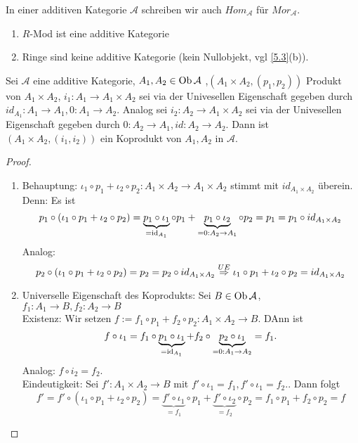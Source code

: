 \begin{anm}
	In einer additiven Kategorie $\mathcal{A} $ schreiben wir auch $Hom_{\mathcal{A}}$ für $Mor_{\mathcal{A}}. $
\end{anm}
\begin{bsp}
	\begin{enumerate} [label=\alph*)]
		\item $R$-Mod ist eine additive Kategorie
		\item Ringe sind keine additive Kategorie (kein Nullobjekt, vgl \ref{5.3}(b)).
	\end{enumerate}
\end{bsp}
\begin{sa}\label{5.11}
	Sei $\mathcal{A} $ eine additive Kategorie, $ A_1,A_2 \in \text{Ob}\,\mathcal{A}$ ,$(A_1 \times A_2, (p_1,p_2)) $ Produkt von $ A_1 \times A_2 $, $ i_1: A_1 \to A_1 \times A_2 $ sei via der Univesellen Eigenschaft gegeben durch $id_{A_1}: A_1 \to A_1 , 0: A_1 \to A_2$. Analog sei $ i_2: A_2 \to A_1 \times A_2 $ sei via der Univesellen Eigenschaft gegeben durch $ 0: A_2 \to A_1, id: A_2 \to A_2$. Dann ist $(A_1 \times A_2, (i_1,i_2)) $ ein Koprodukt von $A_1,A_2$ in $\mathcal{A}$.
\end{sa}
\begin{proof}
	\begin{enumerate}
		\item Behauptung: $\iota_1 \circ p_1 + \iota_2 \circ p_2: A_1 \times A_2 \to A_1 \times A_2 $ stimmt mit $id_{A_1 \times A_2} $ überein. Denn: Es ist
		$$p_1 \circ (\iota_1 \circ p_1 + \iota_2 \circ p_2) = \underbrace{p_1 \circ \iota_1}_{=\operatorname{id}_{A_1}} \circ p_1+ \underbrace{p_1 \circ \iota_2}_{=0:A_2\to A_1} \circ p_2 = p_1 = p_1 \circ id_{A_1 \times A_2}$$ 
		Analog: $$p_2 \circ (\iota_1 \circ p_1 + \iota_2 \circ p_2) = p_2 = p_2 \circ id_{A_1 \times A_2} \overset{UE}{\Rightarrow} \iota_1 \circ p_1 + \iota_2 \circ p_2 = id_{A_1 \times A_2}$$
		\item Universelle Eigenschaft des Koprodukts:
		 Sei $ B \in \text{Ob}\,\mathcal{A} $, $ f_1: A_1 \to B, f_2: A_2 \to B $\\
		 Existenz: Wir setzen $f:= f_1 \circ p_1 + f_2 \circ p_2: A_1 \times A_2 \to B$. DAnn ist 
		 $$f \circ \iota_1 = f_1 \circ \underbrace{p_1 \circ \iota_1}_{=\operatorname{id}_{A_1}} + f_2 \circ \underbrace{p_2 \circ \iota_1}_{=0:A_1 \to A_2} = f_1.$$
		Analog: $f \circ i_2 = f_2.$\\
		Eindeutigkeit: Sei $f': A_1 \times A_2 \to B $ mit $f' \circ \iota_1 = f_1 , f' \circ \iota_1 = f_2.$. Dann folgt 
		$$f' = f' \circ (\iota_1 \circ p_1 + \iota_2 \circ p_2 ) = \underbrace{f' \circ \iota_1}_{=f_1}  \circ p_1 + \underbrace{f' \circ  \iota_2}_{=f_2} \circ p_2 = f_1 \circ p_1 + f_2 \circ p_2 = f $$
	\end{enumerate}
\end{proof}
